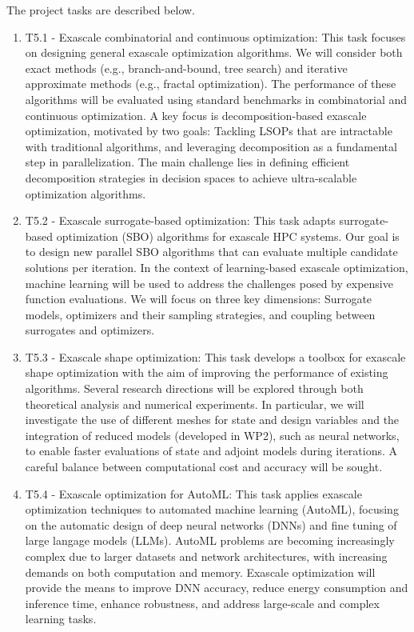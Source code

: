 The project tasks are described below.
\begin{enumerate}
\item T5.1 - Exascale combinatorial and continuous optimization: This task focuses on designing general exascale optimization algorithms. We will consider both exact methods (e.g., branch-and-bound, tree search) and iterative approximate methods (e.g., fractal optimization). The performance of these algorithms will be evaluated using standard benchmarks in combinatorial and continuous optimization. A key focus is decomposition-based exascale optimization, motivated by two goals: Tackling LSOPs that are intractable with traditional algorithms, and leveraging decomposition as a fundamental step in parallelization. The main challenge lies in defining efficient decomposition strategies in decision spaces to achieve ultra-scalable optimization algorithms.

 \item T5.2 - Exascale surrogate-based optimization: This task adapts surrogate-based optimization (SBO) algorithms for exascale HPC systems. Our goal is to design new parallel SBO algorithms that can evaluate multiple candidate solutions per iteration. In the context of learning-based exascale optimization, machine learning will be used to address the challenges posed by expensive function evaluations. We will focus on three key dimensions: Surrogate models, optimizers and their sampling strategies, and coupling between surrogates and optimizers.

 \item T5.3 - Exascale shape optimization: This task develops a toolbox for exascale shape optimization with the aim of improving the performance of existing algorithms. Several research directions will be explored through both theoretical analysis and numerical experiments. In particular, we will investigate the use of different meshes for state and design variables and the integration of reduced models (developed in WP2), such as neural networks, to enable faster evaluations of state and adjoint models during iterations. A careful balance between computational cost and accuracy will be sought.

 \item T5.4 - Exascale optimization for AutoML:
This task applies exascale optimization techniques to automated machine learning (AutoML), focusing on the automatic design of deep neural networks (DNNs) and fine tuning of large langage models (LLMs). AutoML problems are becoming increasingly complex due to larger datasets and network architectures, with increasing demands on both computation and memory. Exascale optimization will provide the means to improve DNN accuracy, reduce energy consumption and inference time, enhance robustness, and address large-scale and complex learning tasks.
\end{enumerate}


